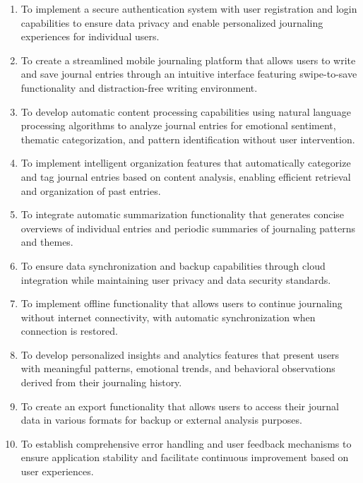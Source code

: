 \begin{enumerate}
	\item To implement a secure authentication system with user registration and login capabilities to ensure data privacy and enable personalized journaling experiences for individual users.
	
	\item To create a streamlined mobile journaling platform that allows users to write and save journal entries through an intuitive interface featuring swipe-to-save functionality and distraction-free writing environment.
	
	\item To develop automatic content processing capabilities using natural language processing algorithms to analyze journal entries for emotional sentiment, thematic categorization, and pattern identification without user intervention.
	
	\item To implement intelligent organization features that automatically categorize and tag journal entries based on content analysis, enabling efficient retrieval and organization of past entries.
	
	\item To integrate automatic summarization functionality that generates concise overviews of individual entries and periodic summaries of journaling patterns and themes.
	
	\item To ensure data synchronization and backup capabilities through cloud integration while maintaining user privacy and data security standards.
	
	\item To implement offline functionality that allows users to continue journaling without internet connectivity, with automatic synchronization when connection is restored.
	
	\item To develop personalized insights and analytics features that present users with meaningful patterns, emotional trends, and behavioral observations derived from their journaling history.
	
	\item To create an export functionality that allows users to access their journal data in various formats for backup or external analysis purposes.
	
	\item To establish comprehensive error handling and user feedback mechanisms to ensure application stability and facilitate continuous improvement based on user experiences.
\end{enumerate}

